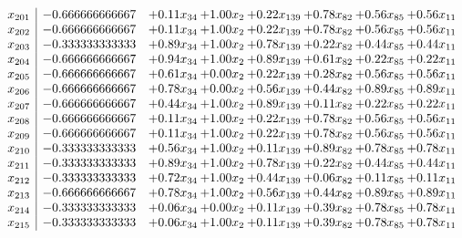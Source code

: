 \documentclass[8pt]{article}
\begin{document}
\[\begin{array}{c| c c@{\hskip 2pt} c@{\hskip 2pt} c@{\hskip 2pt} c@{\hskip 2pt} c@{\hskip 2pt} c@{\hskip 2pt} }
 x_{201}   &  -0.666666666667 & +  0.11 x_{34} & +  1.00 x_{2} & +  0.22 x_{139} & +  0.78 x_{82} & +  0.56 x_{85} & +  0.56 x_{11}\\
 x_{202}   &  -0.666666666667 & +  0.11 x_{34} & +  1.00 x_{2} & +  0.22 x_{139} & +  0.78 x_{82} & +  0.56 x_{85} & +  0.56 x_{11}\\
 x_{203}   &  -0.333333333333 & +  0.89 x_{34} & +  1.00 x_{2} & +  0.78 x_{139} & +  0.22 x_{82} & +  0.44 x_{85} & +  0.44 x_{11}\\
 x_{204}   &  -0.666666666667 & +  0.94 x_{34} & +  1.00 x_{2} & +  0.89 x_{139} & +  0.61 x_{82} & +  0.22 x_{85} & +  0.22 x_{11}\\
 x_{205}   &  -0.666666666667 & +  0.61 x_{34} & +  0.00 x_{2} & +  0.22 x_{139} & +  0.28 x_{82} & +  0.56 x_{85} & +  0.56 x_{11}\\
 x_{206}   &  -0.666666666667 & +  0.78 x_{34} & +  0.00 x_{2} & +  0.56 x_{139} & +  0.44 x_{82} & +  0.89 x_{85} & +  0.89 x_{11}\\
 x_{207}   &  -0.666666666667 & +  0.44 x_{34} & +  1.00 x_{2} & +  0.89 x_{139} & +  0.11 x_{82} & +  0.22 x_{85} & +  0.22 x_{11}\\
 x_{208}   &  -0.666666666667 & +  0.11 x_{34} & +  1.00 x_{2} & +  0.22 x_{139} & +  0.78 x_{82} & +  0.56 x_{85} & +  0.56 x_{11}\\
 x_{209}   &  -0.666666666667 & +  0.11 x_{34} & +  1.00 x_{2} & +  0.22 x_{139} & +  0.78 x_{82} & +  0.56 x_{85} & +  0.56 x_{11}\\
 x_{210}   &  -0.333333333333 & +  0.56 x_{34} & +  1.00 x_{2} & +  0.11 x_{139} & +  0.89 x_{82} & +  0.78 x_{85} & +  0.78 x_{11}\\
 x_{211}   &  -0.333333333333 & +  0.89 x_{34} & +  1.00 x_{2} & +  0.78 x_{139} & +  0.22 x_{82} & +  0.44 x_{85} & +  0.44 x_{11}\\
 x_{212}   &  -0.333333333333 & +  0.72 x_{34} & +  1.00 x_{2} & +  0.44 x_{139} & +  0.06 x_{82} & +  0.11 x_{85} & +  0.11 x_{11}\\
 x_{213}   &  -0.666666666667 & +  0.78 x_{34} & +  1.00 x_{2} & +  0.56 x_{139} & +  0.44 x_{82} & +  0.89 x_{85} & +  0.89 x_{11}\\
 x_{214}   &  -0.333333333333 & +  0.06 x_{34} & +  0.00 x_{2} & +  0.11 x_{139} & +  0.39 x_{82} & +  0.78 x_{85} & +  0.78 x_{11}\\
 x_{215}   &  -0.333333333333 & +  0.06 x_{34} & +  1.00 x_{2} & +  0.11 x_{139} & +  0.39 x_{82} & +  0.78 x_{85} & +  0.78 x_{11}\\

\end{array}\]
\end{document}
